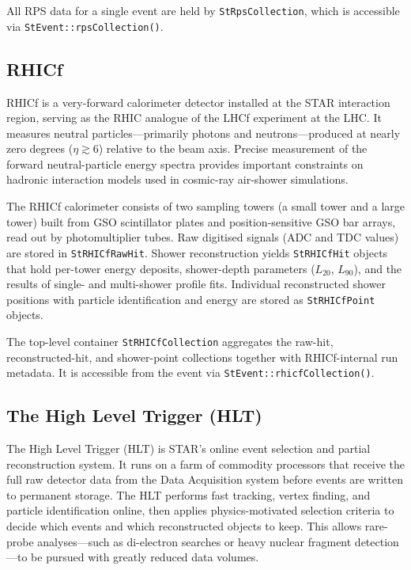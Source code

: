 \documentclass[twoside]{article}
\begin{document}
All RPS data for a single event are held by \texttt{StRpsCollection}, which is
accessible via \texttt{StEvent::rpsCollection()}.

\subsection{RHICf}
RHICf is a very-forward calorimeter detector installed at the STAR interaction
region, serving as the RHIC analogue of the LHCf experiment at the LHC.  It
measures neutral particles---primarily photons and neutrons---produced at nearly
zero degrees ($\eta \gtrsim 6$) relative to the beam axis.  Precise measurement
of the forward neutral-particle energy spectra provides important constraints on
hadronic interaction models used in cosmic-ray air-shower simulations.

The RHICf calorimeter consists of two sampling towers (a small tower and a large
tower) built from GSO scintillator plates and position-sensitive GSO bar arrays,
read out by photomultiplier tubes.  Raw digitised signals (ADC and TDC values)
are stored in \texttt{StRHICfRawHit}.  Shower reconstruction yields
\texttt{StRHICfHit} objects that hold per-tower energy deposits, shower-depth
parameters ($L_{20}$, $L_{90}$), and the results of single- and multi-shower
profile fits.  Individual reconstructed shower positions with particle
identification and energy are stored as \texttt{StRHICfPoint} objects.

The top-level container \texttt{StRHICfCollection} aggregates the raw-hit,
reconstructed-hit, and shower-point collections together with RHICf-internal run
metadata.  It is accessible from the event via \texttt{StEvent::rhicfCollection()}.

\subsection{The High Level Trigger (HLT)}

The High Level Trigger (HLT) is STAR's online event selection and
partial reconstruction system.  It runs on a farm of commodity
processors that receive the full raw detector data from the Data
Acquisition system before events are written to permanent storage.
The HLT performs fast tracking, vertex finding, and particle
identification online, then applies physics-motivated selection
criteria to decide which events and which reconstructed objects to
keep.  This allows rare-probe analyses---such as di-electron
searches or heavy nuclear fragment detection---to be pursued with
greatly reduced data volumes.
\end{document}
